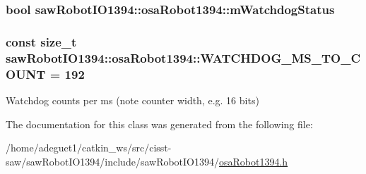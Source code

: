 \hypertarget{classsaw_robot_i_o1394_1_1osa_robot1394_a340e3e038049be9906f65234a7489aa3}{
\subsubsection[{m\-Watchdog\-Status}]{\setlength{\rightskip}{0pt plus 5cm}bool saw\-Robot\-I\-O1394\-::osa\-Robot1394\-::m\-Watchdog\-Status\hspace{0.3cm}{\ttfamily [protected]}}}\label{classsaw_robot_i_o1394_1_1osa_robot1394_a340e3e038049be9906f65234a7489aa3}
\hypertarget{classsaw_robot_i_o1394_1_1osa_robot1394_a3d4cfdd12c7987826fb43028bd06e4b5}{
\subsubsection[{W\-A\-T\-C\-H\-D\-O\-G\-\_\-\-M\-S\-\_\-\-T\-O\-\_\-\-C\-O\-U\-N\-T}]{\setlength{\rightskip}{0pt plus 5cm}const size\-\_\-t saw\-Robot\-I\-O1394\-::osa\-Robot1394\-::\-W\-A\-T\-C\-H\-D\-O\-G\-\_\-\-M\-S\-\_\-\-T\-O\-\_\-\-C\-O\-U\-N\-T = 192\hspace{0.3cm}{\ttfamily [static]}}}\label{classsaw_robot_i_o1394_1_1osa_robot1394_a3d4cfdd12c7987826fb43028bd06e4b5}


Watchdog counts per ms (note counter width, e.\-g. 16 bits) 



The documentation for this class was generated from the following file\-:\begin{DoxyCompactItemize}
\item 
/home/adeguet1/catkin\-\_\-ws/src/cisst-\/saw/saw\-Robot\-I\-O1394/include/saw\-Robot\-I\-O1394/\hyperlink{osa_robot1394_8h}{osa\-Robot1394.\-h}\end{DoxyCompactItemize}
